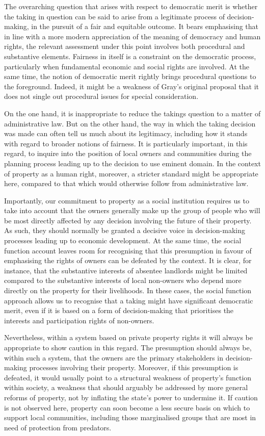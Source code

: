 The overarching question that arises with respect to democratic merit is whether the taking in question 
can be said to arise from a legitimate process of decision-making, in the pursuit of a fair and equitable outcome. It bears emphasising that in line with a more modern appreciation of the meaning of democracy and human rights, the relevant assessment under this point involves both procedural and substantive elements. Fairness in itself is a constraint on the democratic process, particularly when fundamental economic and social rights are involved. At the same time, the notion of democratic merit rightly brings procedural questions to the foreground. Indeed, it might be a weakness of Gray's original proposal that it does not single out procedural issues for special consideration.

On the one hand, it is inappropriate to reduce the takings question to a matter of administrative law. But on the other hand, the way in which the taking decision was made can often tell us much about its legitimacy, including how it stands with regard to broader notions of fairness. It is particularly important, in this regard, to inquire into the position of local owners and communities during the planning process leading up to the decision to use eminent domain. In the context of property as a human right, moreover, a stricter standard might be appropriate here, compared to that which would otherwise follow from administrative law.

Importantly, our commitment to property as a social institution requires us to take into account that the owners generally make up the group of people who will be most directly affected by any decision involving the future of their property. As such, they should normally be granted a decisive voice in decision-making processes leading up to economic development. At the same time, the social function account leaves room for recognising that this presumption in favour of emphasising the rights of owners can be defeated by the context. It is clear, for instance, that the substantive interests of absentee landlords might be limited compared to the substantive interests of local non-owners who depend more directly on the property for their livelihoods. In these cases, the social function approach allows us to recognise that a taking might have significant democratic merit, even if it is based on a form of decision-making that prioritises the interests and participation rights of non-owners.

Nevertheless, within a system based on private property rights it will always be appropriate to show caution in this regard. The presumption should always be, within such a system, that the owners are the primary stakeholders in decision-making processes involving their property. Moreover, if this presumption is defeated, it would usually point to a structural weakness of property's function within society, a weakness that should arguably be addressed by more general reforms of property, not by inflating the state's power to undermine it. If caution is not observed here, property can soon become a less secure basis on which to support local communities, including those marginalised groups that are most in need of protection from predators.

